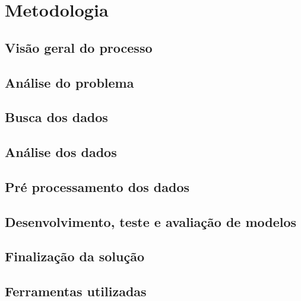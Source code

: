 \chapter{Metodologia}

\section{Visão geral do processo}

\section{Análise do problema}

\section{Busca dos dados}

\section{Análise dos dados}

\section{Pré processamento dos dados}

\section{Desenvolvimento, teste e avaliação de modelos}

\section{Finalização da solução}

\section{Ferramentas utilizadas}